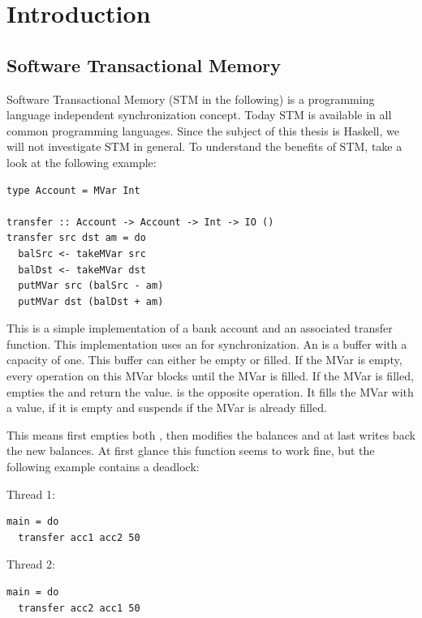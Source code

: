 
\chapter{Introduction} 

\label{Chapter1} 

\section{Software Transactional Memory}
\label{STMInterface}
Software Transactional Memory (STM in the following) is a programming language independent synchronization concept. Today STM is available 
in all common programming languages. Since the subject of this thesis is Haskell, we will not investigate STM in general.
To understand the benefits of STM, take a look at the following example:
\begin{lstlisting}
type Account = MVar Int

transfer :: Account -> Account -> Int -> IO ()
transfer src dst am = do
  balSrc <- takeMVar src
  balDst <- takeMVar dst
  putMVar src (balSrc - am)
  putMVar dst (balDst + am)
\end{lstlisting}
This is a simple implementation of a bank account and an associated transfer function. This implementation uses an 
for synchronization. An  is a buffer with a capacity of one. This buffer can either be empty or filled. If the MVar is empty,
every  operation on this MVar blocks until the MVar is filled. If the MVar is filled,  empties the 
 and return the value.  is the opposite operation. It fills the MVar with a value, if it is empty and 
suspends if the MVar is already filled.

This means  first empties both , then modifies the balances and at last writes back the new balances.
At first glance this function seems to work fine, but the following example contains a deadlock:
\par\noindent
\begin{minipage}[t]{.45\textwidth}
Thread 1:
\begin{lstlisting}[frame=lrtb]
main = do
  transfer acc1 acc2 50
\end{lstlisting}
\end{minipage}
\hfill
\begin{minipage}[t]{.45\textwidth}
Thread 2:
\begin{lstlisting}[frame=lrtb]
main = do
  transfer acc2 acc1 50
\end{lstlisting}
\end{minipage}

